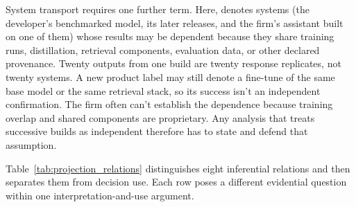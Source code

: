 \documentclass[12pt]{article}
\begin{document}
System transport requires one further term. Here,  denotes systems (the developer's benchmarked model, its later releases, and the firm's assistant built on one of them) whose results may be dependent because they share training runs, distillation, retrieval components, evaluation data, or other declared provenance. Twenty outputs from one build are twenty response replicates, not twenty systems. A new product label may still denote a fine-tune of the same base model or the same retrieval stack, so its success isn't an independent confirmation. The firm often can't establish the dependence because training overlap and shared components are proprietary. Any analysis that treats successive builds as independent therefore has to state and defend that assumption.

Table~\ref{tab:projection_relations} distinguishes eight inferential relations and then separates them from decision use. Each row poses a different evidential question within one interpretation-and-use argument.
\end{document}
